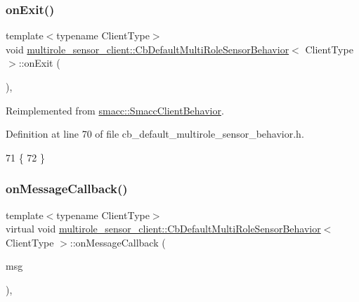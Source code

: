 \subsubsection{\texorpdfstring{on\+Exit()}{onExit()}}
{\footnotesize\ttfamily template$<$typename Client\+Type$>$ \\
void \hyperlink{classmultirole__sensor__client_1_1CbDefaultMultiRoleSensorBehavior}{multirole\+\_\+sensor\+\_\+client\+::\+Cb\+Default\+Multi\+Role\+Sensor\+Behavior}$<$ Client\+Type $>$\+::on\+Exit (\begin{DoxyParamCaption}{ }\end{DoxyParamCaption})\hspace{0.3cm}{\ttfamily [inline]}, {\ttfamily [virtual]}}



Reimplemented from \hyperlink{classsmacc_1_1SmaccClientBehavior_ac0cd72d42bd00425362a97c9803ecce5}{smacc\+::\+Smacc\+Client\+Behavior}.



Definition at line 70 of file cb\+\_\+default\+\_\+multirole\+\_\+sensor\+\_\+behavior.\+h.


\begin{DoxyCode}
71   \{
72   \}
\end{DoxyCode}
\mbox{\label{classmultirole__sensor__client_1_1CbDefaultMultiRoleSensorBehavior_ac982bc1b6ceaa899f9033290b7094bcd}} 
\subsubsection{\texorpdfstring{on\+Message\+Callback()}{onMessageCallback()}}
{\footnotesize\ttfamily template$<$typename Client\+Type$>$ \\
virtual void \hyperlink{classmultirole__sensor__client_1_1CbDefaultMultiRoleSensorBehavior}{multirole\+\_\+sensor\+\_\+client\+::\+Cb\+Default\+Multi\+Role\+Sensor\+Behavior}$<$ Client\+Type $>$\+::on\+Message\+Callback (\begin{DoxyParamCaption}\item[{const \hyperlink{classmultirole__sensor__client_1_1CbDefaultMultiRoleSensorBehavior_a8343b60b6962dd8a5588d8415dd33dd9}{T\+Message\+Type} \&}]{msg }\end{DoxyParamCaption})\hspace{0.3cm}{\ttfamily [inline]}, {\ttfamily [virtual]}}



